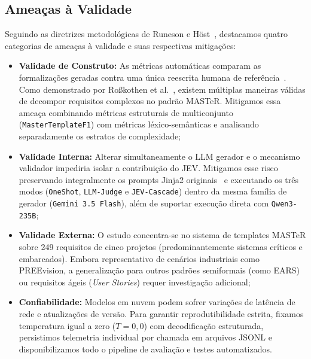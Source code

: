 \subsection{Ameaças à Validade}
Seguindo as diretrizes metodológicas de Runeson e H\"ost~\cite{runeson2009guidelines}, destacamos quatro categorias de ameaças à validade e suas respectivas mitigações:
\begin{itemize}
    \item \textbf{Validade de Construto:} As métricas automáticas comparam as formalizações geradas contra uma única reescrita humana de referência~\cite{grosser2023comparative}. Como demonstrado por Ro\ss kothen et al.~\cite{rosskothen2026converting}, existem múltiplas maneiras válidas de decompor requisitos complexos no padrão MASTeR. Mitigamos essa ameaça combinando métricas estruturais de multiconjunto (\texttt{MasterTemplateF1}) com métricas léxico-semânticas e analisando separadamente os estratos de complexidade;
    \item \textbf{Validade Interna:} Alterar simultaneamente o LLM gerador e o mecanismo validador impediria isolar a contribuição do JEV. Mitigamos esse risco preservando integralmente os prompts Jinja2 originais~\cite{rosskothen2026zenodo} e executando os três modos (\texttt{OneShot}, \texttt{LLM-Judge} e \texttt{JEV-Cascade}) dentro da mesma família de gerador (\texttt{Gemini 3.5 Flash}), além de suportar execução direta com \texttt{Qwen3-235B};
    \item \textbf{Validade Externa:} O estudo concentra-se no sistema de templates MASTeR sobre 249 requisitos de cinco projetos (predominantemente sistemas críticos e embarcados). Embora representativo de cenários industriais como PREEvision, a generalização para outros padrões semiformais (como EARS) ou requisitos ágeis (\textit{User Stories}) requer investigação adicional;
    \item \textbf{Confiabilidade:} Modelos em nuvem podem sofrer variações de latência de rede e atualizações de versão. Para garantir reprodutibilidade estrita, fixamos temperatura igual a zero ($T = 0{,}0$) com decodificação estruturada, persistimos telemetria individual por chamada em arquivos JSONL e disponibilizamos todo o pipeline de avaliação e testes automatizados.
\end{itemize}
